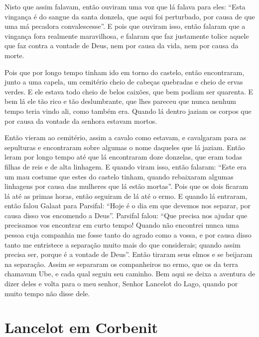 Nisto que assim falavam, então ouviram uma voz que lá falava para eles: “Esta
vingança é do sangue da santa donzela, que aqui foi perturbado, por causa de
que uma má pecadora convalescesse”. E pois que ouviram isso, então
falaram que a vingança fora realmente maravilhosa, e falaram que faz justamente
tolice aquele que faz contra a vontade de Deus, nem por causa da vida, nem por
causa da morte.

Pois que por longo tempo tinham ido em torno do castelo, então encontraram,
junto a uma capela, um cemitério cheio de cabeças quebradas e cheio de ervas
verdes. E ele estava todo cheio de belos caixões, que bem podiam ser quarenta.
E bem lá ele tão rico e tão deslumbrante, que lhes pareceu que nunca nenhum
tempo teria vindo ali, como também era. Quando lá dentro jaziam os corpos que
por causa da vontade da senhora estavam mortos.

Então vieram ao cemitério, assim a cavalo como estavam, e cavalgaram para as
sepulturas e encontraram sobre algumas o nome daqueles que lá jaziam. Então
leram por longo tempo até que lá encontraram doze donzelas, que eram todas
filhas de reis e de alta linhagem. E quando viram isso, então falaram: “Este
era um mau costume que estes do castelo tinham, quando rebaixaram algumas
linhagens por causa das mulheres que lá estão mortas”. Pois que os dois ficaram
lá até as primas horas, então seguiram de lá até o ermo. E quando lá entraram,
então falou Galaat para Parsifal: “Hoje é o dia em que devemos nos separar,
por causa disso vos encomendo a Deus”. Parsifal falou: “Que precisa nos ajudar
que precisamos vos encontrar em curto tempo! Quando não encontrei nunca uma
pessoa cuja companhia me fosse tanto do agrado como a vossa, e por causa disso
tanto me entristece a separação muito mais do que considerais; quando assim
precisa ser, porque é a vontade de Deus”. Então tiraram seus elmos e se
beijaram na separação. Assim se separaram os companheiros no ermo, que os da
terra chamavam Ube, e cada qual seguiu seu caminho. Bem aqui se deixa
a aventura de dizer deles e volta para o meu senhor, Senhor Lancelot do Lago,
quando por muito tempo não disse dele. 

\chapter{Lancelot em Corbenit}

